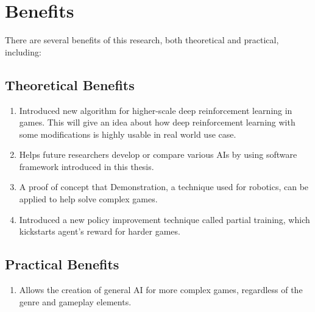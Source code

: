 	\section{Benefits}
	There are several benefits of this research, both theoretical and practical, including:
	\subsection{Theoretical Benefits}
	\begin{enumerate}
	    
        \item
        Introduced new algorithm for higher-scale deep reinforcement learning in games. This will give an idea about how deep reinforcement learning with some modifications is highly usable in real world use case.
        \item Helps future researchers develop or compare various AIs by using software framework introduced in this thesis.
        \item A proof of concept that Demonstration, a technique used for robotics, can be applied to help solve complex games.
	    \item Introduced a new policy improvement technique called partial training, which kickstarts agent's reward for harder games.
	\end{enumerate}
	\subsection{Practical Benefits}
	\begin{enumerate}
        \item
        Allows the creation of general AI for more complex games, regardless of the genre and gameplay elements.
	\end{enumerate}

